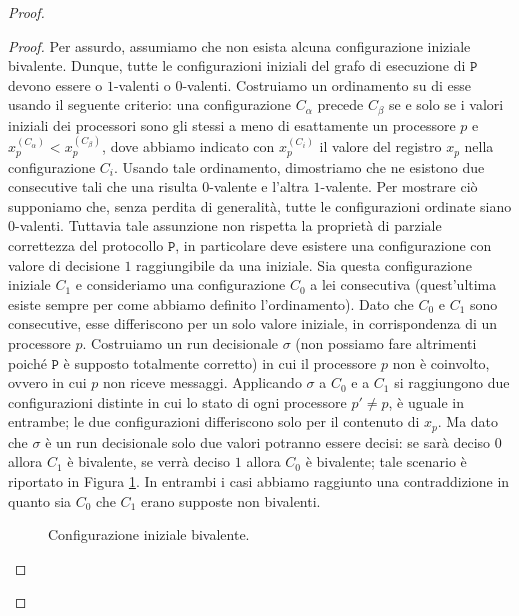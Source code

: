 \documentclass{article}
\begin{document}
\begin{proof}
\begin{proof}
  Per assurdo, assumiamo che non esista alcuna configurazione iniziale
  bivalente. Dunque, tutte le configurazioni iniziali del grafo di
  esecuzione di $\mathtt{P}$ devono essere o $1$-valenti o
  $0$-valenti. Costruiamo un ordinamento su di esse usando il seguente
  criterio: una configurazione $C_\alpha$ precede $C_\beta$ se e solo
  se i valori iniziali dei processori sono gli stessi a meno di
  esattamente un processore $p$ e $x_p^{(C_\alpha)} <
  x_p^{(C_\beta)}$, dove abbiamo indicato con $x_p^{(C_i)}$ il valore
  del registro $x_p$ nella configurazione $C_i$. Usando tale
  ordinamento, dimostriamo che ne esistono due consecutive tali che
  una risulta $0$-valente e l'altra $1$-valente. Per mostrare ciò
  supponiamo che, senza perdita di generalità, tutte le configurazioni
  ordinate siano $0$-valenti. Tuttavia tale assunzione non rispetta la
  proprietà di parziale correttezza del protocollo $\mathtt{P}$, in
  particolare deve esistere una configurazione con valore di decisione
  $1$ raggiungibile da una iniziale. Sia questa configurazione
  iniziale $C_1$ e consideriamo una configurazione $C_0$ a lei
  consecutiva (quest'ultima esiste sempre per come abbiamo definito
  l'ordinamento). Dato che $C_0$ e $C_1$ sono consecutive, esse
  differiscono per un solo valore iniziale, in corrispondenza di un
  processore $p$. Costruiamo un run decisionale $\sigma$ (non possiamo
  fare altrimenti poiché $\mathtt{P}$ è supposto totalmente corretto)
  in cui il processore $p$ non è coinvolto, ovvero in cui $p$ non
  riceve messaggi. Applicando $\sigma$ a $C_0$ e a $C_1$ si
  raggiungono due configurazioni distinte in cui lo stato di ogni
  processore $p'\neq p$, è uguale in entrambe; le due configurazioni
  differiscono solo per il contenuto di $x_p$. Ma dato che $\sigma$ è
  un run decisionale solo due valori potranno essere decisi: se sarà
  deciso $0$ allora $C_1$ è bivalente, se verrà deciso $1$ allora
  $C_0$ è bivalente; tale scenario è riportato in Figura
  \ref{fig:lemma2}. In entrambi i casi abbiamo raggiunto una
  contraddizione in quanto sia $C_0$ che $C_1$ erano supposte non
  bivalenti.  \newpage
\begin{figure}[!h]
  \centering \caption{Configurazione iniziale bivalente.}\label{fig:lemma2}
\end{figure}
\end{proof}
 

\end{proof}
\end{document}
